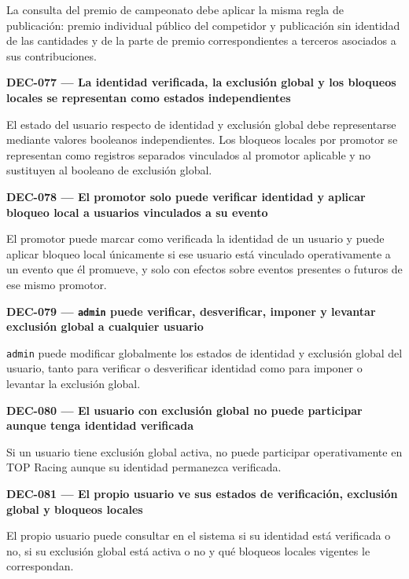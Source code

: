\documentclass[10pt,letterpaper]{article}
\begin{document}
La consulta del premio de campeonato debe aplicar la misma regla de publicación: premio individual público del competidor y publicación sin identidad de las cantidades y de la parte de premio correspondientes a terceros asociados a sus contribuciones.\par\vspace{0.45em}
\noindent\textbf{DEC-077 --- La identidad verificada, la exclusión global y los bloqueos locales se representan como estados independientes}\par
El estado del usuario respecto de identidad y exclusión global debe representarse mediante valores booleanos independientes. Los bloqueos locales por promotor se representan como registros separados vinculados al promotor aplicable y no sustituyen al booleano de exclusión global.\par\vspace{0.45em}
\noindent\textbf{DEC-078 --- El promotor solo puede verificar identidad y aplicar bloqueo local a usuarios vinculados a su evento}\par
El promotor puede marcar como verificada la identidad de un usuario y puede aplicar bloqueo local únicamente si ese usuario está vinculado operativamente a un evento que él promueve, y solo con efectos sobre eventos presentes o futuros de ese mismo promotor.\par\vspace{0.45em}
\noindent\textbf{DEC-079 --- \texttt{admin} puede verificar, desverificar, imponer y levantar exclusión global a cualquier usuario}\par
\texttt{admin} puede modificar globalmente los estados de identidad y exclusión global del usuario, tanto para verificar o desverificar identidad como para imponer o levantar la exclusión global.\par\vspace{0.45em}
\noindent\textbf{DEC-080 --- El usuario con exclusión global no puede participar aunque tenga identidad verificada}\par
Si un usuario tiene exclusión global activa, no puede participar operativamente en TOP Racing aunque su identidad permanezca verificada.\par\vspace{0.45em}
\noindent\textbf{DEC-081 --- El propio usuario ve sus estados de verificación, exclusión global y bloqueos locales}\par
El propio usuario puede consultar en el sistema si su identidad está verificada o no, si su exclusión global está activa o no y qué bloqueos locales vigentes le correspondan.\par\vspace{0.45em}
\end{document}

